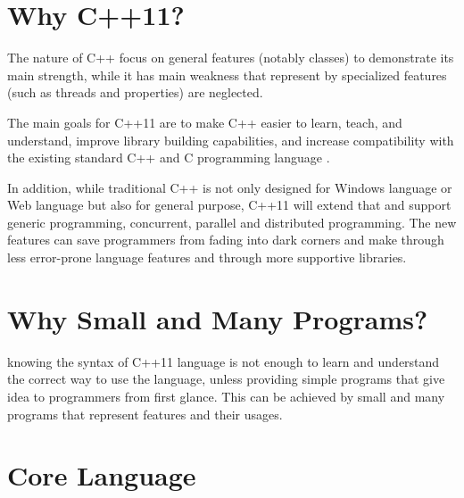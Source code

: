 \documentclass[11pt,]{report}
\begin{document}
\section{Why C++11?}
\label{secton: Why C++11}
The nature of C++ focus on general features (notably classes) to demonstrate its main strength, while it has main weakness that represent by specialized features (such as threads and properties) are neglected.

The main goals for C++11 are to make C++ easier to learn, teach, and understand, improve library building capabilities, and increase compatibility with the existing standard C++ and C programming language \cite{Deitel:2012:CPP}.

In addition, while traditional C++ is not only designed for Windows \linebreak language or Web language but also for general purpose, C++11 will extend that and support generic programming, concurrent, parallel and distributed programming. 
The new features can save programmers from fading into  dark corners  and make through less error-prone language features and through more supportive libraries.


\section{Why Small and Many Programs?}
\label{section: why Small and Many programs}
knowing the syntax of C++11 language is not enough to learn and understand the correct way to use the language, unless providing  simple  programs that give idea to programmers from first glance. This can be achieved by small and many programs that represent features and their usages.


\section{Core Language}
\label{section: core language}
\end{document}
